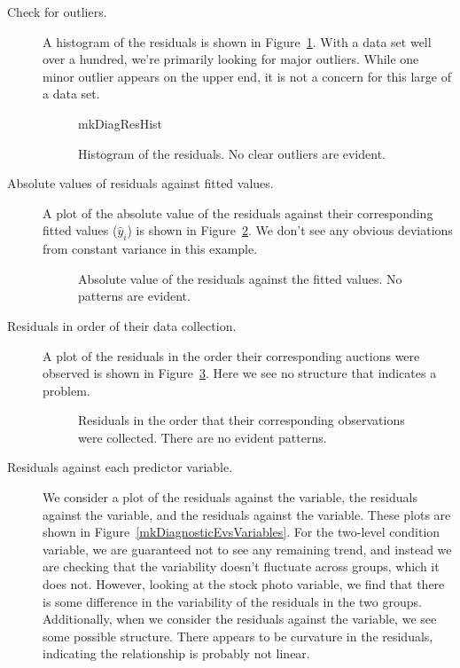 \begin{description}
\item[Check for outliers.]
    A histogram of the residuals is shown in
    Figure~\ref{mkDiagResHist}.
    With a data set well over a hundred, we're primarily
    looking for major outliers.
    While one minor outlier appears on the upper end,
    it is not a concern for this large of a data set.

\begin{figure}[h]
  \centering
      {mkDiagResHist}
  \caption{Histogram of the residuals.
      No clear outliers are evident.}
  \label{mkDiagResHist}
\end{figure}

\item[Absolute values of residuals against fitted values.]
    A plot of the absolute value of the residuals against
    their corresponding fitted values ($\hat{y}_i$) is shown
    in Figure~\ref{mkDiagnosticEvsAbsF}.
    We don't see any obvious deviations from constant variance
    in this example.

\begin{figure}
  \centering
  \caption{Absolute value of the residuals against
      the fitted values.
      No patterns are evident.}
  \label{mkDiagnosticEvsAbsF}
\end{figure}

\item[Residuals in order of their data collection.]
    A plot of the residuals in the order their corresponding
    auctions were observed is shown in
    Figure~\ref{mkDiagnosticInOrder}.
    Here we see no structure that indicates a problem.

\begin{figure}[h]
  \centering
  \caption{Residuals in the order that their
      corresponding observations were collected.
      There are no evident patterns.}
  \label{mkDiagnosticInOrder}
\end{figure}

\item[Residuals against each predictor variable.]
    We consider a plot of the residuals against the
     variable, the residuals against
    the  variable,
    and the residuals against the  variable.
    These plots are shown in Figure~\ref{mkDiagnosticEvsVariables}.
    For the two-level condition variable, we are guaranteed not
    to see any remaining trend, and instead we are checking that
    the variability doesn't fluctuate across groups,
    which it does not.
    However, looking at the stock photo variable,
    we find that there is some difference in the variability
    of the residuals in the two groups.
    Additionally, when we consider the residuals against the
     variable, we see some possible structure.
    There appears to be curvature in the residuals,
    indicating the relationship is probably not linear.


\end{description}
